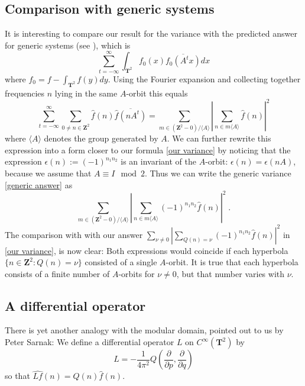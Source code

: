 \documentclass[12pt]{amsart}
\theoremstyle{plain}
\newcommand{\Z}{{\mathbf Z}}
\newcommand{\diff}{L}
\newcommand{\TT}{\mathbf T^2}
\newcommand{\rmk}[1]{\footnote{{\bf Comment:} #1}}
\renewcommand{\^}{\widehat}
\newcommand{\vnn}{\nu}
\begin{document}
\subsection{Comparison with generic systems} \label{comparison}
It is interesting to compare our result for the variance with 
the predicted answer for generic systems 
(see \cite{feingold-peres-matrix-elements, EFKAMM}), which is 
\begin{equation}\label{generic answer} 
\sum_{t=-\infty}^\infty \int_{\TT}  f_0(x) \overline{f_0(A^tx)} dx
\end{equation}
where  $f_0=f-\int_{\TT} f(y)dy $. Using the Fourier expansion
and collecting together frequencies $n$ lying in the same $A$-orbit
this equals 
$$
\sum_{t=-\infty}^\infty \sum_{0\neq n\in \Z^2} 
\^f(n)\overline{\^f(n A^t)} 
=
\sum_{m\in (\Z^2-0)/\langle A \rangle} \left| \sum_{n\in m\langle A
\rangle} \^f(n) \right|^2 
$$
where $\langle A \rangle$ denotes the group generated by $A$. We can
further rewrite this expression into a form closer to our 
formula \eqref{our variance} by noticing that the expression
$\epsilon(n):=(-1)^{n_1n_2}$ is an invariant of the $A$-orbit:
$\epsilon(n)=\epsilon(nA)$, because we assume that $A\equiv I \mod
2$. Thus we can write the generic variance \eqref{generic answer} as 
\begin{equation}\label{generic variance}
\sum_{m\in (\Z^2-0)/\langle A \rangle} \left| \sum_{n\in m\langle A
\rangle} (-1)^{n_1 n_2}\^f(n) \right|^2 \;.
\end{equation}
The comparison with with our answer 
$
\sum_{\vnn\neq 0} \left|\sum_{Q(n)=\vnn} (-1)^{n_1n_2} \^f(n) \right|^2  
$
in \eqref{our variance}, is now clear: Both expressions would coincide if each hyperbola
$\{n\in \Z^2 : Q(n)=\vnn\}$ consisted of a single $A$-orbit. It is
true that each 
hyperbola consists of a finite number of $A$-orbits for $\vnn\neq 0$, 
but that number varies with $\vnn$. 


\subsection{A differential operator}\label{sec:diff}
There is yet another analogy with the modular domain, pointed out to
us by Peter Sarnak: 
We define a differential operator $\diff$ on $C^\infty(\TT)$ by
$$
\diff = -\frac 1{4\pi^2} 
Q( \frac{\partial}{ \partial p}, \frac{\partial}{ \partial q})
$$
so that $\widehat{\diff f}(n) = Q(n)\^f (n)$. 
\end{document}
